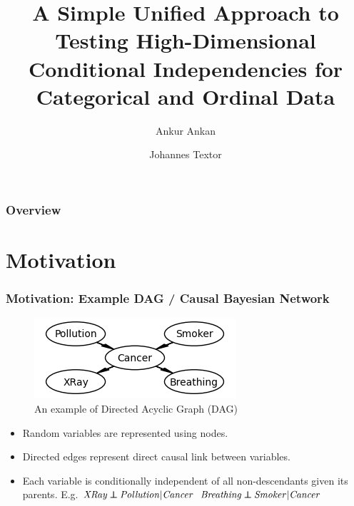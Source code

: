 \documentclass{beamer}
\def\ci{\perp\!\!\!\!\!\perp}
\begin{document}
\title{A Simple Unified Approach to Testing High-Dimensional Conditional
Independencies for Categorical and Ordinal Data}
\author {Ankur Ankan \and Johannes Textor}
\date{}
\maketitle

\begin{frame}
	\frametitle{Overview}
	\tableofcontents
\end{frame}

\section{Motivation}
\begin{frame}
	\frametitle{Motivation: Example DAG / Causal Bayesian Network}
	\begin{figure}
		\centering
		\includegraphics[scale=0.6]{imgs/example_dag.png}
		\caption*{An example of Directed Acyclic Graph (DAG) \footnotemark}
	\end{figure}
	\begin{itemize}
		\setlength\itemsep{1em}
		\item Random variables are represented using nodes.
		\item Directed edges represent direct causal link between variables.
		\item Each variable is conditionally independent of all non-descendants given its parents. E.g. \newline
			\hspace*{20pt} $ \text{\emph{XRay}} \ci \text{\emph{Pollution}} | \text{\emph{Cancer}} $ \newline
			\hspace*{20pt} $ \text{\emph{Breathing}} \ci \text{\emph{Smoker}} | \text{\emph{Cancer}} $
	\end{itemize}
\end{frame}
\end{document}
